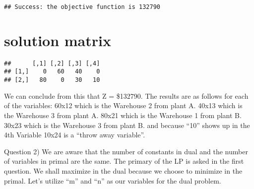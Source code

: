 \documentclass[
]{article}
\newenvironment{Shaded}{\begin{snugshade}}{\end{snugshade}}
\newcommand{\FunctionTok}[1]{\textcolor[rgb]{0.00,0.00,0.00}{#1}}
\newcommand{\NormalTok}[1]{#1}
\newcommand{\SpecialCharTok}[1]{\textcolor[rgb]{0.00,0.00,0.00}{#1}}
\newcommand{\StringTok}[1]{\textcolor[rgb]{0.31,0.60,0.02}{#1}}
\begin{document}
\begin{verbatim}
## Success: the objective function is 132790
\end{verbatim}

\hypertarget{solution-matrix}{%
\section{solution matrix}\label{solution-matrix}}

\begin{Shaded}
\end{Shaded}

\begin{verbatim}
##      [,1] [,2] [,3] [,4]
## [1,]    0   60   40    0
## [2,]   80    0   30   10
\end{verbatim}

We can conclude from this that Z = \$132790. The results are as follows
for each of the variables: 60x12 which is the Warehouse 2 from plant A.
40x13 which is the Warehouse 3 from plant A. 80x21 which is the
Warehouse 1 from plant B. 30x23 which is the Warehouse 3 from plant B.
and because ``10'' shows up in the 4th Variable 10x24 is a ``throw away
variable''.

Question 2) We are aware that the number of constants in dual and the
number of variables in primal are the same. The primary of the LP is
asked in the first question. We shall maximize in the dual because we
choose to minimize in the primal. Let's utilize ``m'' and ``n'' as our
variables for the dual problem.
\end{document}
